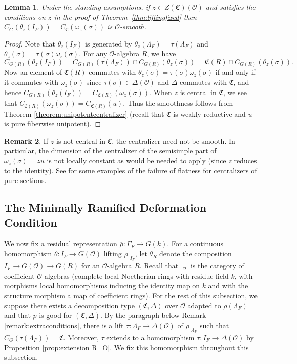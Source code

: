 \documentclass[11pt, letterpaper,english]{amsart}
\theoremstyle{plain}
\newtheorem{lem}{Lemma}
\theoremstyle{definition}
\newtheorem{remark}[lem]{Remark}
\numberwithin{equation}{section}
\numberwithin{lem}{section}
\newcommand{\fC}{\mathfrak{C}}
\newcommand{\cC}{\mathcal{C}}
\newcommand{\cO}{\mathcal{O}}
\newcommand{\rhobar}{{\overline{\rho}}}
\newcommand{\cent}[2]{C_{#1}(#2)}
\newcommand{\Ld}{\Lambda}
\newcommand{\Dt}{\Delta}
\DeclareMathOperator{\CLN}{\widehat{\cC}}
\begin{document}
%

\begin{lem} \label{lem:centralizer of theta}
Under the standing assumptions, if $z \in Z(\fC)(\cO)$ and satisfies the conditions on $z$ in the proof of Theorem~\ref{thm:liftingfixed} then
$\cent{G}{\theta_z(I_F)}=\cent{\fC}{\omega_z(\sigma)}$ is $\cO$-smooth.
\end{lem}

\begin{proof}
Note that $\theta_z(I_F)$ is generated by $\theta_z(\Ld_F)=\tau(\Ld_F)$ and $\theta_z(\sigma)=\tau(\sigma)\omega_z(\sigma)$. 
For any $\cO$-algebra $R$, we have
$$\cent{G(R)}{\theta_z(I_F)}=\cent{G(R)}{\tau(\Ld_F)} \cap \cent{G(R)}{\theta_z(\sigma)}=\fC(R) \cap \cent{G(R)}{\theta_z(\sigma)}.$$
Now an element of $\fC(R)$ commutes with $\theta_z(\sigma) = \tau(\sigma) \omega_z(\sigma)$ if and only if it commutes with $\omega_z(\sigma)$ since $\tau(\sigma) \in \Delta(\cO)$ and $\Delta$ commutes with $\fC$, and hence
$\cent{G(R)}{\theta_z(I_F)}=\cent{\fC(R)}{\omega_z(\sigma)}$. When $z$ is central in $\fC$, we see that $\cent{\fC(R)}{\omega_z(\sigma)} = \cent{\fC(R)}{u}$.  Thus the smoothness follows from Theorem \ref{theorem:unipotentcentralizer} (recall that $\fC$ is weakly reductive and $u$ is pure fiberwise unipotent). 
\end{proof}

\begin{remark}
If $z$ is not central in $\fC$, the centralizer need not be smooth.  In particular, the dimension of the centralizer of the semisimple part of $\omega_z(\sigma) = z u$ is not locally constant as would be needed to apply \cite[Theorem 1.1]{cotner} (since $z$ reduces to the identity). See \cite[Remark 5.5]{cotner} for some examples of the failure of flatness for centralizers of pure sections.
\end{remark}

\subsection{The Minimally Ramified Deformation Condition} \label{ss:mrdefcondition}

We now fix a residual representation $\rhobar : \Gamma_F \to G(k)$.  
For a continuous homomorphism $\theta \colon I_F \to G(\cO)$ lifting $\rhobar|_{I_F}$, let $\theta_R$ denote the composition $I_F \to G(\cO) \to G(R)$ for an $\cO$-algebra $R$. Recall that $\CLN_{\cO}$ is the category of coefficient $\cO$-algebras (complete local Noetherian rings with residue
field $k$, with morphisms local homomorphisms inducing the identity map on $k$ and with the
structure morphism a map of coefficient rings). 
For the rest of this subsection, we suppose there exists a decomposition type $(\fC, \Dt)$ over $\cO$ adapted to $\rhobar(\Ld_F)$ and that $p$ is good for $(\fC, \Dt)$. By the paragraph below Remark \ref{remark:extraconditions}, there is a lift $\tau \colon \Ld_F \to \Dt(\cO)$ of $\rhobar|_{\Ld_F}$ such that $\cent{G}{\tau(\Ld_F)}=\fC$. Moreover, $\tau$ extends to a homomorphism $\tau \colon I_F \to \Dt(\cO)$ by Proposition \ref{prop:extension R=O}. We fix this homomorphism throughout this subsection. 
\end{document}
